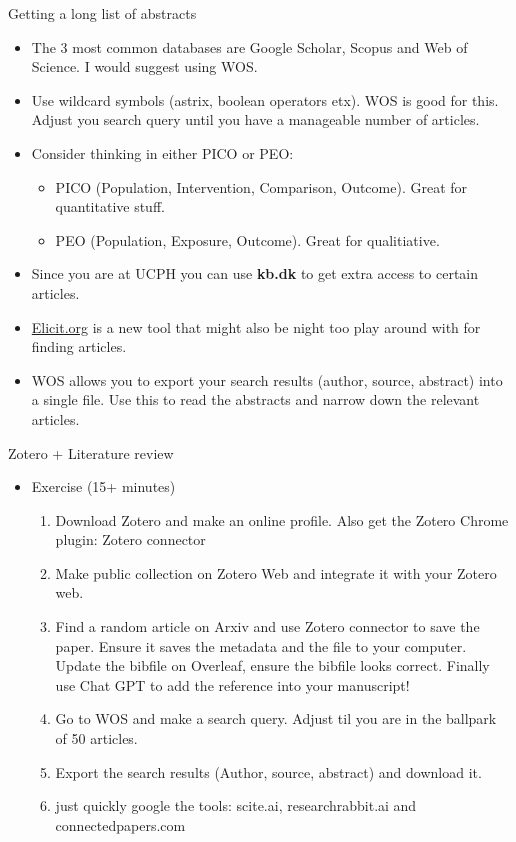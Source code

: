 \documentclass{beamer}
\begin{document}
\begin{frame}{Getting a long list of abstracts}
\begin{itemize}
    \item The 3 most common databases are Google Scholar, Scopus and Web of Science. I would suggest using WOS.
    \item Use wildcard symbols (astrix, boolean operators etx). WOS is good for this. Adjust you search query until you have a manageable number of articles.
    \item Consider thinking in either PICO or PEO:
    \begin{itemize}
        \item PICO (Population, Intervention, Comparison, Outcome). Great for quantitative stuff.
        \item PEO  (Population, Exposure, Outcome). Great for qualitiative.
    \end{itemize}
    \item Since you are at UCPH you can use \textbf{kb.dk} to get extra access to certain articles.
    \item \url{Elicit.org} is a new tool that might also be night too play around with for finding articles.
    \item WOS allows you to export your search results (author, source, abstract) into a single file. Use this to read the abstracts and narrow down the relevant articles.
\end{itemize}
\end{frame}

\begin{frame}{Zotero + Literature review}
\begin{itemize}
    \item Exercise (15+ minutes)
    \begin{enumerate}
        \item Download Zotero and make an online profile. Also get the Zotero Chrome plugin: Zotero connector
        \item Make public collection on Zotero Web and integrate it with your Zotero web.
        \item Find a random article on Arxiv and use Zotero connector to save the paper. Ensure it saves the metadata and the file to your computer. Update the bibfile on Overleaf, ensure the bibfile looks correct. Finally use Chat GPT to add the reference into your manuscript!
        \item Go to WOS and make a search query. Adjust til you are in the ballpark of 50 articles.
        \item Export the search results (Author, source, abstract) and download it.
        \item just quickly google the tools: scite.ai, researchrabbit.ai and connectedpapers.com
    \end{enumerate}
\end{itemize}
    
\end{frame}
\end{document}
